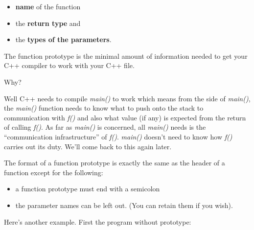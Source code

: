 \documentclass[
]{article}
\providecommand{\tightlist}{%
  \setlength{\itemsep}{0pt}\setlength{\parskip}{0pt}}
\begin{document}
\begin{itemize}
\tightlist
\item
  \textbf{name} of the function
\item
  the \textbf{return type} and
\item
  the \textbf{types of the parameters}.
\end{itemize}

The function prototype is the minimal amount of information needed to
get your C++ compiler to work with your C++ file.

Why?

Well C++ needs to compile \emph{main()} to work which means from the
side of \emph{main()}, the \emph{main()} function needs to know what to
push onto the stack to communication with \emph{f()} and also what value
(if any) is expected from the return of calling \emph{f()}. As far as
\emph{main()} is concerned, all \emph{main()} needs is the
``communication infrastructure'' of \emph{f()}. \emph{main()} doesn't
need to know how \emph{f()} carries out its duty. We'll come back to
this again later.

The format of a function prototype is exactly the same as the header of
a function except for the following:

\begin{itemize}
\tightlist
\item
  a function prototype must end with a semicolon
\item
  the parameter names can be left out. (You can retain them if you
  wish).
\end{itemize}

Here's another example. First the program without prototype:
\end{document}
